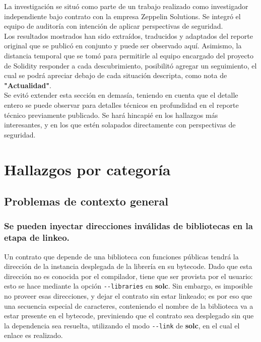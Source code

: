 La investigación se situó como parte de un trabajo realizado como investigador independiente bajo contrato con la empresa Zeppelin Solutions. Se integró el equipo de auditoría con intención de aplicar perspectivas de seguridad.\\

Los resultados mostrados han sido extraídos, traducidos y adaptados del reporte original que se publicó en conjunto y puede ser observado aquí\cite{SolidityCompilerAuditReportZep}. Asimismo, la distancia temporal que se tomó para permitirle al equipo encargado del proyecto de Solidity responder a cada descubrimiento, posibilitó agregar un seguimiento, el cual se podrá apreciar debajo de cada situación descripta, como nota de \textbf{"Actualidad"}.\\

Se evitó extender esta sección en demasía, teniendo en cuenta que el detalle entero se puede observar para detalles técnicos en profundidad en el reporte técnico previamente publicado. Se hará hincapié en los hallazgos más interesantes, y en los que estén solapados directamente con perspectivas de seguridad.\\

\section{Hallazgos por categoría}
\subsection{Problemas de contexto general}
\subsubsection{Se pueden inyectar direcciones inválidas de bibliotecas en la etapa de linkeo.
}

Un contrato que depende de una biblioteca con funciones públicas tendrá la dirección de la instancia desplegada de la librería en su bytecode. Dado que esta dirección no es conocida por el compilador, tiene que ser provista por el usuario: esto se hace mediante la opción \verb|--libraries| en \textbf{solc}. Sin embargo, es imposible no proveer esas direcciones, y dejar el contrato sin estar linkeado; es por eso que una secuencia especial de caracteres, conteniendo el nombre de la biblioteca va a estar presente en el bytecode, previniendo que el contrato sea desplegado sin que la dependencia sea resuelta, utilizando el modo \verb|--link| de \textbf{solc}, en el cual el enlace es realizado.\\

